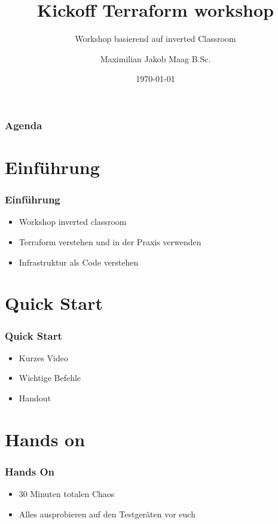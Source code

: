\documentclass{beamer}
\title{Kickoff Terraform workshop}
\subtitle{Workshop basierend auf inverted Classroom}
\author{Maximilian Jakob Maag B.Sc.}
\date{\today}
\begin{document}
    \begin{frame}
        \titlepage
    \end{frame}
    \begin{frame}
        \frametitle{Agenda}
        \tableofcontents
    \end{frame}
    \section{Einführung}
    \begin{frame}
        \frametitle{Einführung}
        \begin{itemize}
            \item Workshop inverted classroom
            \item Terraform verstehen und in der Praxis verwenden
            \item Infrastruktur als Code verstehen
        \end{itemize}
    \end{frame}
    \section{Quick Start}
    \begin{frame}
        \frametitle{Quick Start}
        \begin{itemize}
            \item Kurzes Video
            \item Wichtige Befehle
            \item Handout
        \end{itemize}
    \end{frame}
    \section{Hands on}
    \begin{frame}
        \frametitle{Hands On}
        \begin{itemize}
            \item 30 Minuten totalen Chaos
            \item Alles ausprobieren auf den Testgeräten vor euch
        \end{itemize}
    \end{frame}
\end{document}
